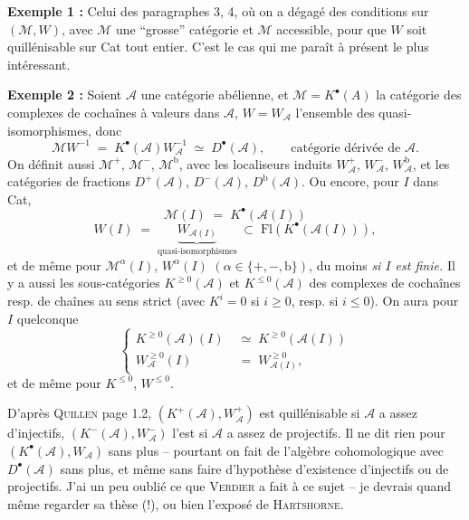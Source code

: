 \documentclass[11pt]{article}
\newcommand{\printedpage}[1]{\marginpar{\footnotesize p.~#1}}
\newcommand{\msp}[1]{\marginpar{\footnotesize [#1]}}
\begin{document}
\textbf{Exemple 1 :} Celui des paragraphes 3, 4, où on a dégagé des conditions sur $(\mathcal{M},W)$, avec $\mathcal{M}$ une ``grosse'' catégorie et $\mathcal{M}$ accessible, pour que $W$ soit quillénisable sur Cat tout entier. C'est le cas qui me paraît à présent le plus intéressant.

\textbf{Exemple 2 :} Soient $\mathcal{A}$ une catégorie abélienne, et $\mathcal{M} = K^{\bullet}(A)$ la catégorie des complexes de cochaînes à valeurs dans $\mathcal{A}$, $W = W_{\mathcal{A}}$ l'ensemble des quasi-isomorphismes, donc %
\[ \mathcal{M}W^{-1} \;=\; K^{\bullet}(\mathcal{A})W_{\mathcal{A}}^{-1} \;\simeq\; D^{\bullet}(\mathcal{A}), \qquad \text{catégorie dérivée de $\mathcal{A}$.} \]
On définit aussi $\mathcal{M}^{+}$, $\mathcal{M}^{-}$, $\mathcal{M}^{\mathrm{b}}$, avec les localiseurs induits $W_{\mathcal{A}}^{+}$, $W_{\mathcal{A}}^{-}$, $W_{\mathcal{A}}^{\mathrm{b}}$, et les catégories de fractions $D^{+}(\mathcal{A})$, $D^{-}(\mathcal{A})$, $D^{\mathrm{b}}(\mathcal{A})$. Ou
\msp{page 52}encore, pour $I$ dans Cat,
\[ \mathcal{M}(I) \;=\; K^{\bullet}(\mathcal{A}(I)) \]
\printedpage{30}
\[ W(I) \;=\; \underbrace{W_{\mathcal{A}(I)}}_{\text{quasi-isomorphismes}} \;\subset\; \mathrm{Fl}(K^{\bullet}(\mathcal{A}(I))), \]
et de même pour $\mathcal{M}^{\alpha}(I)$, $W^{\alpha}(I)$ $(\alpha \in \{+,-,\mathrm{b}\})$, du moins \textit{si $I$ est finie.} Il y a aussi les sous-catégories $K^{\geq 0}(\mathcal{A})$ et $K^{\leq 0}(\mathcal{A})$ des complexes de cochaînes resp. de chaînes au sens strict (avec $K^{i} = 0$ si $i \geq 0$, resp. si $i \leq 0$). On aura pour $I$ quelconque
\[ \left\{ \begin{aligned} K^{\geq 0}(\mathcal{A})(I) &\;\simeq\; K^{\geq 0}(\mathcal{A}(I)) \\ W_{\mathcal{A}}^{\geq 0}(I) &\;=\; W_{\mathcal{A}(I)}^{\geq 0}, \end{aligned} \right. \]
et de même pour $K^{\leq 0}$, $W^{\leq 0}$.

D'après \textsc{Quillen} page 1.2, $(K^{+}(\mathcal{A}),W_{\mathcal{A}}^{+})$ est quillénisable si $\mathcal{A}$ a assez d'injectifs, $(K^{-}(\mathcal{A}),W_{\mathcal{A}}^{-})$ l'est si $\mathcal{A}$ a assez de projectifs. Il ne dit rien pour $(K^{\bullet}(\mathcal{A}),W_{\mathcal{A}})$ sans plus -- pourtant on fait de l'algèbre cohomologique avec $D^{\bullet}(\mathcal{A})$ sans plus, et même sans faire d'hypothèse d'existence d'injectifs ou de projectifs. J'ai un peu oublié ce que \textsc{Verdier} a fait à ce sujet -- je devrais quand même regarder sa thèse (!), ou bien l'exposé de \textsc{Hartshorne}.
\end{document}
